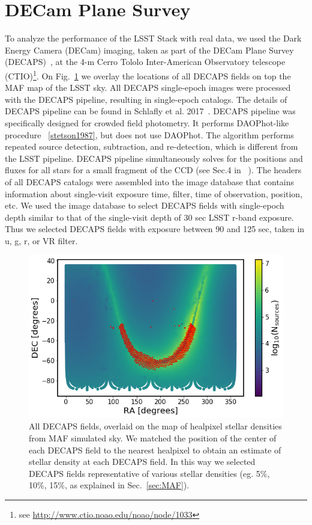 \documentclass[DM,lsstdraft,toc,usenatbib]{lsstdoc}
\begin{document}
\section{DECam Plane Survey }
\label{sec:DECAPS}
To analyze the performance of the LSST Stack with real data, we used the Dark Energy Camera (DECam) imaging, taken as part of the  DECam Plane Survey (DECAPS)~\cite{schlafly2017}, at the 4-m Cerro Tololo Inter-American Observatory telescope (CTIO)\footnote{see \url{http://www.ctio.noao.edu/noao/node/1033}}. On Fig.~\ref{fig:decaps_fields} we overlay the locations of all DECAPS fields on top  the MAF map of the LSST sky. All DECAPS single-epoch images were processed with the DECAPS pipeline, resulting in single-epoch catalogs. The details of DECAPS pipeline can be found in Schlafly et al. 2017~\cite{schlafly2017}. DECAPS pipeline was specifically designed for crowded field photometry. It performs DAOPhot-like procedure ~\ref{stetson1987}, but does not use DAOPhot. The algorithm performs repeated source detection, subtraction, and re-detection, which is different from the LSST pipeline. DECAPS pipeline simultaneously solves for the positions and fluxes for all stars for a small fragment of the CCD (see Sec.4 in ~\cite{schlafly2017}).  The headers of all DECAPS catalogs were assembled into the image database that contains information about single-visit exposure time, filter,  time of observation, position, etc. We used the image database to select DECAPS fields with single-epoch depth similar to that of the single-visit depth of 30 sec LSST  r-band exposure. Thus we selected DECAPS fields with  exposure between 90  and 125 sec, taken in   u, g, r,  or VR filter. 

\begin{figure}
\includegraphics[width=1.0\columnwidth]{figs/04_MAF_DECAPS_sources.png}
\caption{All DECAPS fields, overlaid on the map of healpixel stellar densities from MAF simulated sky.  We matched the position of the center of each DECAPS field to the nearest healpixel to obtain an estimate of stellar density at each DECAPS field. In this way we selected DECAPS fields representative of various stellar densities (eg. 5\%, 10\%, 15\%, as explained in Sec.~\ref{sec:MAF}). }
\label{fig:decaps_fields}
\end{figure} 
\end{document}
